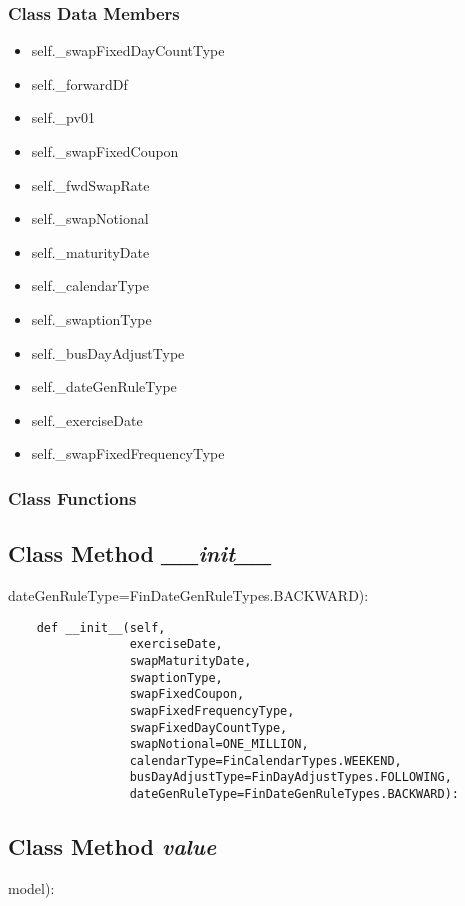 \documentclass[twoside,11pt]{book}
\begin{document}
\subsubsection{Class Data Members}
\begin{itemize}
\item{self.\_swapFixedDayCountType}
\item{self.\_forwardDf}
\item{self.\_pv01}
\item{self.\_swapFixedCoupon}
\item{self.\_fwdSwapRate}
\item{self.\_swapNotional}
\item{self.\_maturityDate}
\item{self.\_calendarType}
\item{self.\_swaptionType}
\item{self.\_busDayAdjustType}
\item{self.\_dateGenRuleType}
\item{self.\_exerciseDate}
\item{self.\_swapFixedFrequencyType}
\end{itemize}

\subsubsection{Class Functions}

\subsection{Class Method {\it \_\_init\_\_}}
dateGenRuleType=FinDateGenRuleTypes.BACKWARD):

\begin{lstlisting}
    def __init__(self,
                 exerciseDate,
                 swapMaturityDate,
                 swaptionType,
                 swapFixedCoupon,
                 swapFixedFrequencyType,
                 swapFixedDayCountType,
                 swapNotional=ONE_MILLION,
                 calendarType=FinCalendarTypes.WEEKEND,
                 busDayAdjustType=FinDayAdjustTypes.FOLLOWING,
                 dateGenRuleType=FinDateGenRuleTypes.BACKWARD):
\end{lstlisting}

\subsection{Class Method {\it value}}
model):
\end{document}
